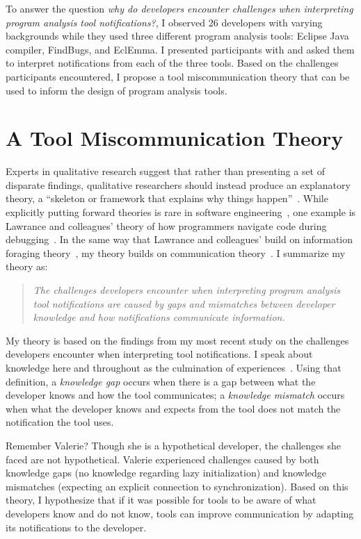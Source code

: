\documentclass{llncs}
\begin{document}
To answer the question \emph{why do developers encounter challenges when interpreting program analysis tool notifications?}, I observed 26 developers with varying backgrounds while they used three different program analysis tools: Eclipse Java compiler, FindBugs, and EclEmma. I presented participants with and asked them to interpret notifications from each of the three tools. Based on the challenges participants encountered, I propose a tool miscommunication theory that can be used to inform the design of program analysis tools.

\section{A Tool Miscommunication Theory}\label{sec:theory}

Experts in qualitative research suggest that rather than presenting a set of disparate findings, qualitative researchers should instead produce an explanatory theory, a ``skeleton or framework that explains why things happen''~\cite{corbin2014basics}. While explicitly putting forward theories is rare in software engineering~\cite{hannay2007systematic}, one example is Lawrance and colleagues' theory of how programmers navigate code during debugging~\cite{lawrance2013programmers}. In the same way that Lawrance and colleagues' build on 
information foraging theory~\cite{pirolli1999information}, my theory builds on communication theory~\cite{bowman1987modeling}.
I summarize my theory as:

\begin{quotation}
	\noindent
	\emph{The challenges developers encounter when interpreting program analysis tool notifications are caused by gaps and mismatches between developer knowledge and how notifications communicate information.}
\end{quotation}

My theory is based on the findings from my most recent study on the challenges developers encounter when interpreting tool notifications. 
I speak about knowledge here and throughout as the culmination of experiences~\cite{johnson1989mental,argote2011organizational}.
Using that definition, a \emph{knowledge gap} occurs when there is a gap between what the developer knows and how the tool communicates; a \emph{knowledge mismatch} occurs when what the developer knows and expects from the tool does not match the notification the tool uses.

Remember Valerie? Though she is a hypothetical developer, the challenges she faced are not hypothetical. Valerie experienced challenges caused by both knowledge gaps (no knowledge regarding lazy initialization) and knowledge mismatches (expecting an explicit connection to synchronization). Based on this theory, I hypothesize that if it was possible for tools to be aware of what developers know and do not know, tools can improve communication by adapting its notifications to the developer.
\end{document}
